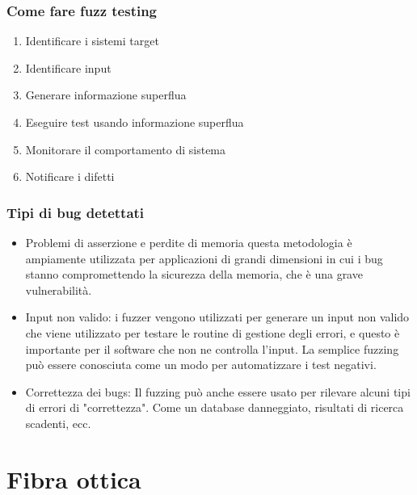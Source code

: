 \documentclass[8pt]{extarticle}
\begin{document}
\subsubsection{Come fare fuzz testing}
\begin{enumerate}
    \item Identificare i sistemi target
    \item Identificare input
    \item Generare informazione superflua
    \item Eseguire test usando informazione superflua
    \item Monitorare il comportamento di sistema
    \item Notificare i difetti
\end{enumerate}
\subsubsection{Tipi di bug detettati}
\begin{itemize}
    \item Problemi di asserzione e perdite di memoria questa metodologia è ampiamente utilizzata per 
    applicazioni di grandi dimensioni in cui i bug stanno compromettendo la sicurezza della memoria, 
    che è una grave vulnerabilità.
    \item Input non valido: i fuzzer vengono utilizzati per generare un input non valido che viene 
    utilizzato per testare le routine di gestione degli errori, e questo è importante per il software 
    che non ne controlla l'input. La semplice fuzzing può essere conosciuta come un modo per 
    automatizzare i test negativi.
    \item Correttezza dei bugs: Il fuzzing può anche essere usato per rilevare alcuni tipi di errori 
    di "correttezza". Come un database danneggiato, risultati di ricerca scadenti, ecc.
\end{itemize}
\section{Fibra ottica}
\end{document}
